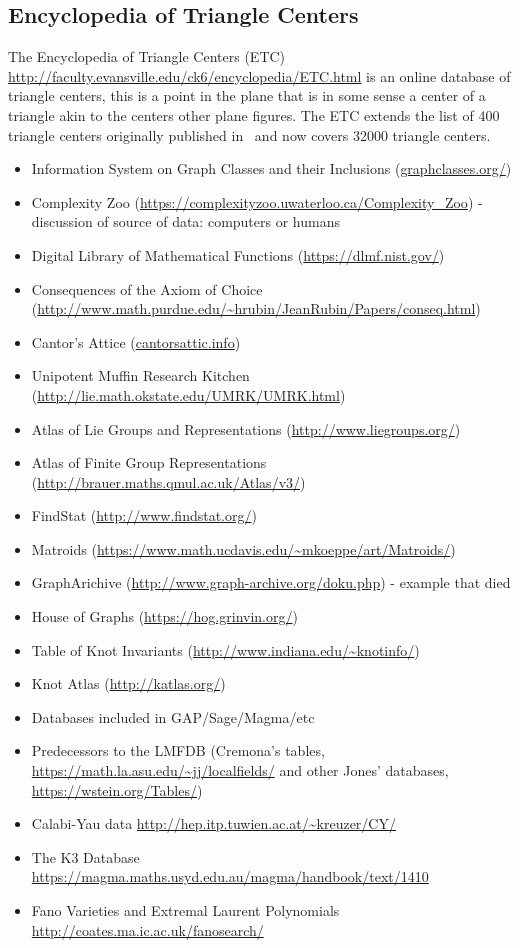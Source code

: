 \documentclass{article}
\begin{document}
\subsection{Encyclopedia of Triangle Centers}

The Encyclopedia of Triangle Centers (ETC) \url{http://faculty.evansville.edu/ck6/encyclopedia/ETC.html} is an online database of triangle centers, this is a point in the plane that is in some sense a center of a triangle akin to the centers other plane figures.
The ETC extends the list of 400 triangle centers originally published in~\cite{kimberling-98} and now covers 32000 triangle centers.



\begin{itemize}
\item Information System on Graph Classes and their Inclusions (\url{graphclasses.org/})
\item Complexity Zoo (\url{https://complexityzoo.uwaterloo.ca/Complexity_Zoo}) - discussion of source of data: computers or humans
\item Digital Library of Mathematical Functions (\url{https://dlmf.nist.gov/})
\item Consequences of the Axiom of Choice (\url{http://www.math.purdue.edu/~hrubin/JeanRubin/Papers/conseq.html})
\item Cantor's Attice (\url{cantorsattic.info})
\item Unipotent Muffin Research Kitchen (\url{http://lie.math.okstate.edu/UMRK/UMRK.html})
\item Atlas of Lie Groups and Representations (\url{http://www.liegroups.org/})
\item Atlas of Finite Group Representations (\url{http://brauer.maths.qmul.ac.uk/Atlas/v3/})
\item FindStat (\url{http://www.findstat.org/})
\item Matroids (\url{https://www.math.ucdavis.edu/~mkoeppe/art/Matroids/})
\item GraphArichive (\url{http://www.graph-archive.org/doku.php}) - example that died
\item House of Graphs (\url{https://hog.grinvin.org/})
\item Table of Knot Invariants (\url{http://www.indiana.edu/~knotinfo/})
\item Knot Atlas (\url{http://katlas.org/})
\item Databases included in GAP/Sage/Magma/etc
\item Predecessors to the LMFDB (Cremona's tables, \url{https://math.la.asu.edu/~jj/localfields/} and other Jones' databases, \url{https://wstein.org/Tables/})
\item Calabi-Yau data \url{http://hep.itp.tuwien.ac.at/~kreuzer/CY/}
\item The K3 Database \url{https://magma.maths.usyd.edu.au/magma/handbook/text/1410}
\item Fano Varieties and Extremal Laurent Polynomials \url{http://coates.ma.ic.ac.uk/fanosearch/}
\end{itemize}
\end{document}
